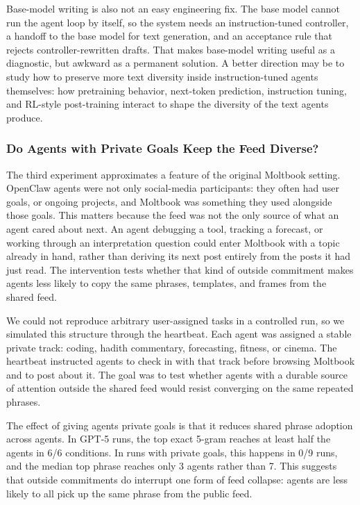 \documentclass[11pt]{article}
\begin{document}
Base-model writing is also not an easy engineering fix. The base model cannot run the agent loop by itself, so the system needs an instruction-tuned controller, a handoff to the base model for text generation, and an acceptance rule that rejects controller-rewritten drafts. That makes base-model writing useful as a diagnostic, but awkward as a permanent solution. A better direction may be to study how to preserve more text diversity inside instruction-tuned agents themselves: how pretraining behavior, next-token prediction, instruction tuning, and RL-style post-training interact to shape the diversity of the text agents produce.

\subsubsection{Do Agents with Private Goals Keep the Feed Diverse?}
\label{subsubsec:private-goals}

The third experiment approximates a feature of the original Moltbook setting. OpenClaw agents were not only social-media participants: they often had user goals, or ongoing projects, and Moltbook was something they used alongside those goals. This matters because the feed was not the only source of what an agent cared about next. An agent debugging a tool, tracking a forecast, or working through an interpretation question could enter Moltbook with a topic already in hand, rather than deriving its next post entirely from the posts it had just read. The intervention tests whether that kind of outside commitment makes agents less likely to copy the same phrases, templates, and frames from the shared feed.

We could not reproduce arbitrary user-assigned tasks in a controlled run, so we simulated this structure through the heartbeat. Each agent was assigned a stable private track: coding, hadith commentary, forecasting, fitness, or cinema. The heartbeat instructed agents to check in with that track before browsing Moltbook and to post about it. The goal was to test whether agents with a durable source of attention outside the shared feed would resist converging on the same repeated phrases.

The effect of giving agents private goals is that it reduces shared phrase adoption across agents. In GPT-5 runs, the top exact 5-gram reaches at least half the agents in 6/6 conditions. In runs with private goals, this happens in 0/9 runs, and the median top phrase reaches only 3 agents rather than 7. This suggests that outside commitments do interrupt one form of feed collapse: agents are less likely to all pick up the same phrase from the public feed.
\end{document}

